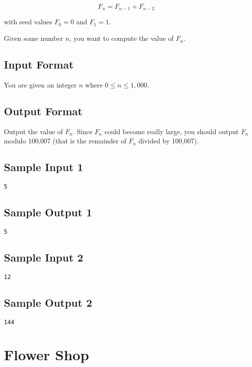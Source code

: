 \documentclass[12pt]{article}
\begin{document}
\begin{equation*}
F_n = F_{n-1} + F_{n-2}
\end{equation*}

with seed values $F_0 = 0$ and $F_1 = 1$. 

Given some number $n$, you want to compute the value of $F_n$. 

\subsection*{Input Format}
You are given an integer $n$ where $0 \leq n \leq 1,000$. 

\subsection*{Output Format}
Output the value of $F_n$.  Since $F_n$ could become really large, you should output $F_n$ modulo 100,007 (that is the remainder of $F_n$ divided by 100,007).

\subsection*{Sample Input 1}
\begin{verbatim}
5
\end{verbatim}
\subsection*{Sample Output 1}
\begin{verbatim}
5
\end{verbatim}

\subsection*{Sample Input 2}
\begin{verbatim}
12
\end{verbatim}
\subsection*{Sample Output 2}
\begin{verbatim}
144
\end{verbatim}






\newpage

\section{Flower Shop}
\end{document}

